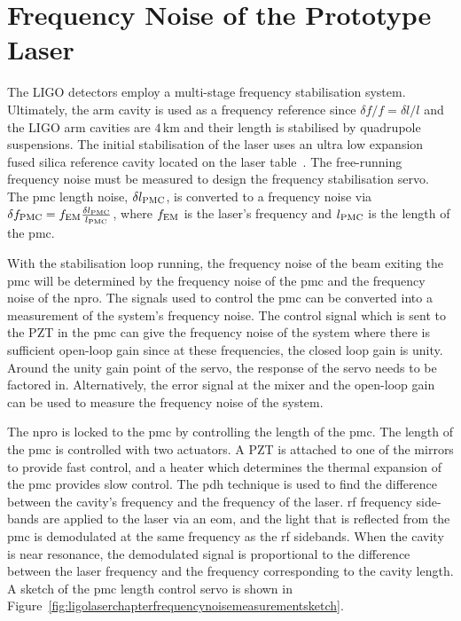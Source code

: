 \section{Frequency Noise of the Prototype Laser}
The LIGO detectors employ a multi-stage frequency stabilisation system. Ultimately, the arm cavity is used as a frequency reference since $\delta f/f = \delta l/l$ and the LIGO arm cavities are $4$\,km and their length is stabilised by quadrupole suspensions. The initial stabilisation of the laser uses an ultra low expansion fused silica reference cavity located on the laser table~\cite{PSL_final_design}. The free-running frequency noise must be measured to design the frequency stabilisation servo. The \gls{pmc} length noise, $\delta l_{\rm{PMC}}$, is converted to a frequency noise via $\delta f_{\rm{PMC}} = f_{\rm{EM}}\frac{\delta l_{\rm{PMC}}}{l_{\rm{PMC}}}$, where $f_{\rm{EM}}$ is the laser's frequency and $l_{\rm{PMC}}$ is the length of the \gls{pmc}.
\par
With the stabilisation loop running, the frequency noise of the beam exiting the \gls{pmc} will be determined by the frequency noise of the \gls{pmc} and the frequency noise of the \gls{npro}. The signals used to control the \gls{pmc} can be converted into a measurement of the system's frequency noise. The control signal which is sent to the PZT in the \gls{pmc} can give the frequency noise of the system where there is sufficient open-loop gain since at these frequencies, the closed loop gain is unity. Around the unity gain point of the servo, the response of the servo needs to be factored in. Alternatively, the error signal at the mixer and the open-loop gain can be used to measure the frequency noise of the system.
\par
The \gls{npro} is locked to the \gls{pmc} by controlling the length of the \gls{pmc}. The length of the \gls{pmc} is controlled with two actuators. A PZT is attached to one of the mirrors to provide fast control, and a heater which determines the thermal expansion of the \gls{pmc} provides slow control. The \gls{pdh} technique is used to find the difference between the cavity's frequency and the frequency of the laser. \gls{rf} frequency side-bands are applied to the laser via an \gls{eom}, and the light that is reflected from the \gls{pmc} is demodulated at the same frequency as the \gls{rf} sidebands. When the cavity is near resonance, the demodulated signal is proportional to the difference between the laser frequency and the frequency corresponding to the cavity length. A sketch of the \gls{pmc} length control servo is shown in Figure~\ref{fig:ligolaserchapterfrequencynoisemeasurementsketch}.
